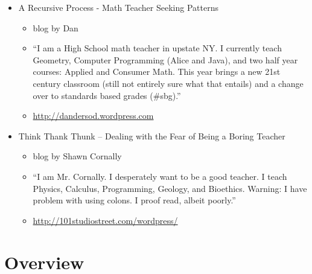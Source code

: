 \begin{itemize}
\item A Recursive Process - Math Teacher Seeking Patterns
\begin{itemize}[noitemsep]
\item blog by Dan
\item “I am a High School math teacher in upstate NY. I currently teach Geometry, Computer Programming (Alice and Java), and two half year courses: Applied and Consumer Math. This year brings a new 21st century classroom (still not entirely sure what that entails) and a change over to standards based grades (#sbg).”
\item \underline{http://dandersod.wordpress.com }
\end{itemize}

\item Think Thank Thunk – Dealing with the Fear of Being a Boring Teacher 
\begin{itemize} [noitemsep]
\item blog by Shawn Cornally
\item “I am Mr. Cornally. I desperately want to be a good teacher. I teach Physics, Calculus, Programming, Geology, and Bioethics. Warning: I have problem with using colons. I proof read, albeit poorly.”
\item \underline{http://101studiostreet.com/wordpress/}
\end{itemize}
\end{itemize}

\section{Overview}
